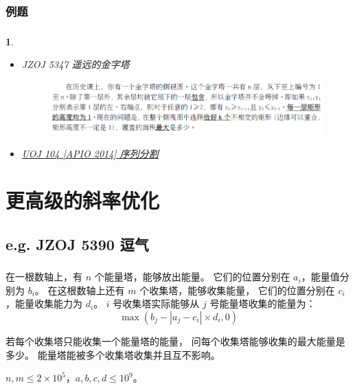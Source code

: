 \documentclass[9pt, UTF8]{beamer} %
\newcommand \fts {\frametitle{\insertsubsection}}
\newcommand \ftss {\frametitle{\insertsubsubsection}}
\newtheorem*{bbox}{}
\begin{document}
	\subsubsection{例题}

	\begin{frame}
		\ftss

		\begin{bbox}
			\begin{itemize}
				\item
				JZOJ 5347 遥远的金字塔

				\begin{figure}
					\includegraphics[scale=0.45]{pic/pic4.png}
				\end{figure}

				\item
				\href {http://uoj.ac/problem/104} {UOJ 104 [APIO 2014] 序列分割}
			\end{itemize}
		\end{bbox}
	\end{frame}

	\section{更高级的斜率优化}

	\subsection{e.g. JZOJ 5390 逗气}

	\begin{frame}
		\fts

		在一根数轴上，有 $n$ 个能量塔，能够放出能量。
		它们的位置分别在 $a_i$，能量值分别为 $b_i$。
		在这根数轴上还有 $m$ 个收集塔，能够收集能量，
		它们的位置分别在 $c_i$，能量收集能力为 $d_i$。
		$i$ 号收集塔实际能够从 $j$ 号能量塔收集的能量为：
		$$
		\max(b_j - |a_j - c_i| \times d_i, 0)
		$$

		若每个收集塔只能收集一个能量塔的能量，
		问每个收集塔能够收集的最大能量是多少。
		能量塔能被多个收集塔收集并且互不影响。

		\bigskip

		$n, m \le 2 \times 10^5$，$a, b, c, d \le 10^9$。
	\end{frame}
\end{document}

